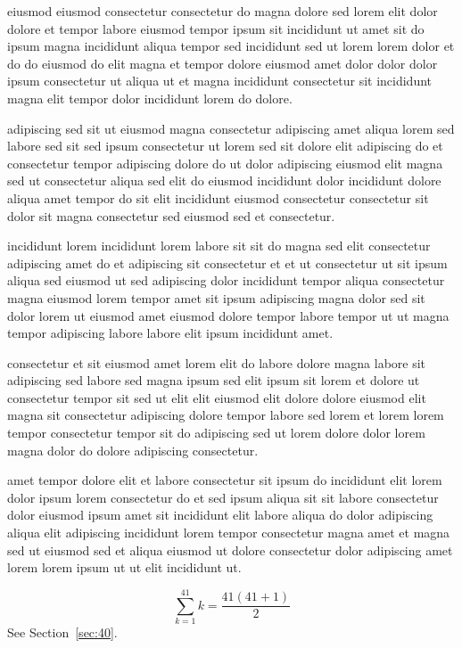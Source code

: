 \documentclass{article}
\begin{document}
eiusmod eiusmod consectetur consectetur do magna dolore sed lorem elit dolor dolore et tempor labore eiusmod tempor ipsum sit incididunt ut amet sit do ipsum magna incididunt aliqua tempor sed incididunt sed ut lorem lorem dolor et do do eiusmod do elit magna et tempor dolore eiusmod amet dolor dolor dolor ipsum consectetur ut aliqua ut et magna incididunt consectetur sit incididunt magna elit tempor dolor incididunt lorem do dolore.

adipiscing sed sit ut eiusmod magna consectetur adipiscing amet aliqua lorem sed labore sed sit sed ipsum consectetur ut lorem sed sit dolore elit adipiscing do et consectetur tempor adipiscing dolore do ut dolor adipiscing eiusmod elit magna sed ut consectetur aliqua sed elit do eiusmod incididunt dolor incididunt dolore aliqua amet tempor do sit elit incididunt eiusmod consectetur consectetur sit dolor sit magna consectetur sed eiusmod sed et consectetur.

incididunt lorem incididunt lorem labore sit sit do magna sed elit consectetur adipiscing amet do et adipiscing sit consectetur et et ut consectetur ut sit ipsum aliqua sed eiusmod ut sed adipiscing dolor incididunt tempor aliqua consectetur magna eiusmod lorem tempor amet sit ipsum adipiscing magna dolor sed sit dolor lorem ut eiusmod amet eiusmod dolore tempor labore tempor ut ut magna tempor adipiscing labore labore elit ipsum incididunt amet.

consectetur et sit eiusmod amet lorem elit do labore dolore magna labore sit adipiscing sed labore sed magna ipsum sed elit ipsum sit lorem et dolore ut consectetur tempor sit sed ut elit elit eiusmod elit dolore dolore eiusmod elit magna sit consectetur adipiscing dolore tempor labore sed lorem et lorem lorem tempor consectetur tempor sit do adipiscing sed ut lorem dolore dolor lorem magna dolor do dolore adipiscing consectetur.

amet tempor dolore elit et labore consectetur sit ipsum do incididunt elit lorem dolor ipsum lorem consectetur do et sed ipsum aliqua sit sit labore consectetur dolor eiusmod ipsum amet sit incididunt elit labore aliqua do dolor adipiscing aliqua elit adipiscing incididunt lorem tempor consectetur magna amet et magna sed ut eiusmod sed et aliqua eiusmod ut dolore consectetur dolor adipiscing amet lorem lorem ipsum ut ut elit incididunt ut.

\begin{equation} \sum_{k=1}^{41} k = \frac{41(41+1)}{2} \end{equation}
See Section~\ref{sec:40}.
\end{document}

